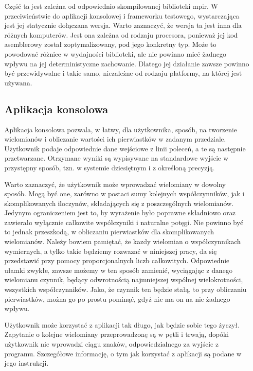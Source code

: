 \documentclass[twoside,a4paper]{book}
\begin{document}
Część ta jest zależna od odpowiednio skompilowanej biblioteki mpir. W przeciwieństwie do aplikacji konsolowej i frameworku testowego, wystarczająca jest jej statycznie dołączana wersja. Warto zaznaczyć, że wersja ta jest inna dla różnych komputerów. Jest ona zależna od rodzaju procesora, ponieważ jej kod asemblerowy został zoptymalizowany, pod jego konkretny typ. Może to powodować różnice w wydajności biblioteki, ale nie powinno mieć żadnego wpływu na jej deterministyczne zachowanie. Dlatego jej działanie zawsze powinno być przewidywalne i takie samo, niezależne od rodzaju platformy, na której jest używana.

\subsection{Aplikacja konsolowa}

Aplikacja konsolowa pozwala, w łatwy, dla użytkownika, sposób, na tworzenie wielomianów i obliczanie wartości ich pierwiastków w zadanym przedziale. Użytkownik podaje odpowiednie dane wejściowe z linii poleceń, a te są następnie przetwarzane. Otrzymane wyniki są wypisywane na standardowe wyjście w przystępny sposób, tzn. w systemie dziesiętnym i z określoną precyzją.

Warto zaznaczyć, że użytkownik może wprowadzać wielomiany w dowolny sposób. Mogą być one, zarówno w postaci sumy kolejnych współczynników, jak i skomplikowanych iloczynów, składających się z poszczególnych wielomianów. Jedynym ograniczeniem jest to, by wyrażenie było poprawne składniowo oraz zawierało wyłącznie całkowite współczyniki i naturalne potęgi. Nie powinno być to jednak przeszkodą, w obliczaniu pierwiastków dla skomplikowanych wielomianów. Należy bowiem pamiętać, że kazdy wielomian o współczynnikach wymiernych, a tylko takie będziemy rozwazać w niniejszej pracy, da się przedstawić przy pomocy proporcjonalnych liczb całkowitych. Odpowiednie ułamki zwykłe, zawsze możemy w ten sposób zamienić, wyciągając z danego wielomianu czynnik, będący odwrotnością najmniejszej wspólnej wielokrotności, wszystkich współczynników. Jako, że czynnik ten będzie stałą, to przy obliczaniu pierwiastków, można go po prostu pominąć, gdyż nie ma on na nie żadnego wpływu.

Użytkownik może korzystać z aplikacji tak długo, jak będzie sobie tego życzył. Zapytanie o kolejne wielomiany przeprowadzonę są w pętli i trwają, dopóki użytkownik nie wprowadzi ciągu znaków, odpowiedzialnego za wyjście z programu. Szczegółowe informację, o tym jak korzystać z aplikacji są podane w jego instrukcji.
\end{document}
